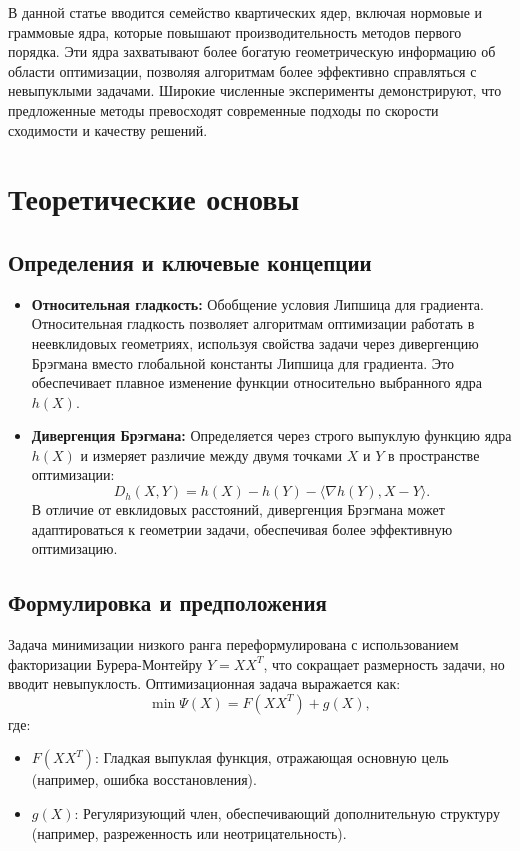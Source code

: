 \documentclass[a4paper,11pt]{article}
\begin{document}
В данной статье вводится семейство квартических ядер, включая нормовые и граммовые ядра, которые повышают производительность методов первого порядка. Эти ядра захватывают более богатую геометрическую информацию об области оптимизации, позволяя алгоритмам более эффективно справляться с невыпуклыми задачами. Широкие численные эксперименты демонстрируют, что предложенные методы превосходят современные подходы по скорости сходимости и качеству решений.

\section{Теоретические основы}
\subsection{Определения и ключевые концепции}
\begin{itemize}
    \item \textbf{Относительная гладкость:} Обобщение условия Липшица для градиента. Относительная гладкость позволяет алгоритмам оптимизации работать в неевклидовых геометриях, используя свойства задачи через дивергенцию Брэгмана вместо глобальной константы Липшица для градиента. Это обеспечивает плавное изменение функции относительно выбранного ядра \(h(X)\).
    \item \textbf{Дивергенция Брэгмана:} Определяется через строго выпуклую функцию ядра \(h(X)\) и измеряет различие между двумя точками \(X\) и \(Y\) в пространстве оптимизации:
    \[
    D_h(X, Y) = h(X) - h(Y) - \langle \nabla h(Y), X - Y \rangle.
    \]
    В отличие от евклидовых расстояний, дивергенция Брэгмана может адаптироваться к геометрии задачи, обеспечивая более эффективную оптимизацию.
\end{itemize}

\subsection{Формулировка и предположения}
Задача минимизации низкого ранга переформулирована с использованием факторизации Бурера-Монтейру \(Y = XX^T\), что сокращает размерность задачи, но вводит невыпуклость. Оптимизационная задача выражается как:
\[
\min \Psi(X) = F(XX^T) + g(X),
\]
где:
\begin{itemize}
    \item \(F(XX^T)\): Гладкая выпуклая функция, отражающая основную цель (например, ошибка восстановления).
    \item \(g(X)\): Регуляризующий член, обеспечивающий дополнительную структуру (например, разреженность или неотрицательность).
\end{itemize}
\end{document}
